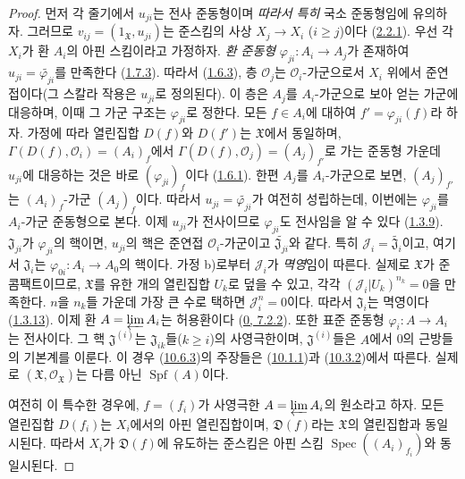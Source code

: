 \begin{proof}
먼저 각 줄기에서 $u_{ji}$는 전사 준동형이며
\emph{따라서 특히} 국소 준동형임에 유의하자. 그러므로
$v_{ij}=(1_{\mathfrak{X}},u_{ji})$는 준스킴의 사상
$X_j\to X_i$ ($i\geq j$)이다
(\hyperref[I.2.2.1-ko]{2.2.1}). 우선 각 $X_i$가
환 $A_i$의 아핀 스킴이라고 가정하자.
\emph{환 준동형}
$\varphi_{ji}:A_i\to A_j$가 존재하여
$u_{ji}=\widetilde{\varphi_{ji}}$를 만족한다
(\hyperref[I.1.7.3-ko]{1.7.3}). 따라서
(\hyperref[I.1.6.3-ko]{1.6.3}), 층 $\mathscr{O}_j$는
$\mathscr{O}_i$-가군으로서 $X_i$ 위에서 준연접이다(그 스칼라
작용은 $u_{ji}$로 정의된다). 이 층은 $A_j$를 $A_i$-가군으로 보아
얻는 가군에 대응하며, 이때 그 가군 구조는 $\varphi_{ji}$로 정한다.
모든 $f\in A_i$에 대하여
$f'=\varphi_{ji}(f)$라 하자. 가정에 따라 열린집합 $D(f)$와
$D(f')$는 $\mathfrak{X}$에서 동일하며,
$\Gamma(D(f),\mathscr{O}_i)=(A_i)_f$에서
$\Gamma(D(f),\mathscr{O}_j)=(A_j)_{f'}$로 가는 준동형 가운데
$u_{ji}$에 대응하는 것은 바로
$(\varphi_{ji})_f$이다
(\hyperref[I.1.6.1-ko]{1.6.1}). 한편 $A_j$를 $A_i$-가군으로 보면,
$(A_j)_{f'}$는 $(A_i)_f$-가군 $(A_j)_f$이다. 따라서
$u_{ji}=\widetilde{\varphi_{ji}}$가 여전히 성립하는데, 이번에는
$\varphi_{ji}$를 $A_i$-가군 준동형으로 본다. 이제 $u_{ji}$가
전사이므로 $\varphi_{ji}$도 전사임을 알 수 있다
(\hyperref[I.1.3.9-ko]{1.3.9}). $\mathfrak{J}_{ji}$가
$\varphi_{ji}$의 핵이면, $u_{ji}$의 핵은 준연접
$\mathscr{O}_i$-가군이고 $\widetilde{\mathfrak{J}_{ji}}$와 같다. 특히
$\mathscr{J}_i=\widetilde{\mathfrak{J}_i}$이고, 여기서
$\mathfrak{J}_i$는 $\varphi_{0i}:A_i\to A_0$의 핵이다. 가정 b)로부터
$\mathscr{J}_i$가 \emph{멱영}임이 따른다. 실제로
$\mathfrak{X}$가 준콤팩트이므로, $\mathfrak{X}$를 유한 개의
열린집합 $U_k$로 덮을 수 있고, 각각
$(\mathscr{J}_i|U_k)^{n_k}=0$을 만족한다.
$n$을 $n_k$들 가운데 가장 큰 수로 택하면
$\mathscr{J}_i^n=0$이다. 따라서 $\mathfrak{J}_i$는 멱영이다
(\hyperref[I.1.3.13-ko]{1.3.13}). 이제 환
$A=\varprojlim A_i$는 허용환이다
(\hyperref[0.7.2.2-ko]{0, 7.2.2}). 또한 표준 준동형
$\varphi_i:A\to A_i$는 전사이다. 그 핵 $\mathfrak{J}^{(i)}$는
$\mathfrak{J}_{ik}$들($k\geq i$)의 사영극한이며,
$\mathfrak{J}^{(i)}$들은 $A$에서 0의 근방들의 기본계를 이룬다.
이 경우 (\hyperref[I.10.6.3-ko]{10.6.3})의 주장들은
(\hyperref[I.10.1.1-ko]{10.1.1})과
(\hyperref[I.10.3.2-ko]{10.3.2})에서 따른다. 실제로
$(\mathfrak{X},\mathscr{O}_{\mathfrak{X}})$는 다름 아닌
$\operatorname{Spf}(A)$이다.

여전히 이 특수한 경우에, $f=(f_i)$가 사영극한
$A=\varprojlim A_i$의 원소라고 하자. 모든 열린집합 $D(f_i)$는
$X_i$에서의 아핀 열린집합이며, $\mathfrak{D}(f)$라는
$\mathfrak{X}$의 열린집합과 동일시된다. 따라서 $X_i$가
$\mathfrak{D}(f)$에 유도하는 준스킴은 아핀 스킴
$\operatorname{Spec}((A_i)_{f_i})$와 동일시된다.


\end{proof}
